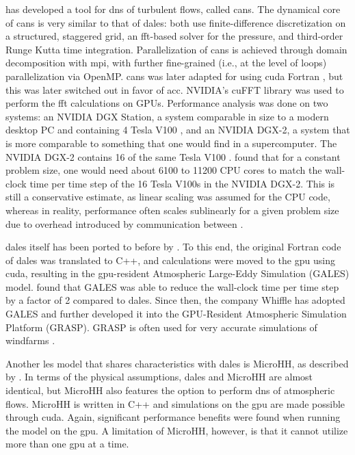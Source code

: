 \citet{costaFFTbasedFinitedifferenceSolver2018} has developed a tool for \acrshort{dns} of turbulent flows, called \acrshort{cans}. The dynamical core of \acrshort{cans} is very similar to that of \acrshort{dales}: both use finite-difference discretization on a structured, staggered grid, an \acrshort{fft}-based solver for the pressure, and third-order Runge Kutta time integration. Parallelization of \acrshort{cans} is achieved through domain decomposition with \acrshort{mpi}, with further fine-grained (i.e., at the level of loops) parallelization via OpenMP. \acrshort{cans} was later adapted for  using \acrshort{cuda} Fortran \citep{costaGPUAccelerationCaNS2021}, but this was later switched out in favor of \acrshort{acc}. NVIDIA's cuFFT library was used to perform the \acrshort{fft} calculations on GPUs. Performance analysis was done on two systems: an NVIDIA DGX Station, a system comparable in size to a modern desktop PC and containing 4 Tesla V100 , and an NVIDIA DGX-2, a system that is more comparable to something that one would find in a supercomputer. The NVIDIA DGX-2 contains 16 of the same Tesla V100 . \citet{costaGPUAccelerationCaNS2021} found that for a constant problem size, one would need about 6100 to 11200 CPU cores to match the wall-clock time per time step of the 16 Tesla V100s in the NVIDIA DGX-2. This is still a conservative estimate, as linear scaling was assumed for the CPU code, whereas in reality, performance often scales sublinearly for a given problem size due to overhead introduced by communication between .

\acrshort{dales} itself has been ported to  before by \citet{schalkwijkHighPerformanceSimulationsTurbulent2012}. To this end, the original Fortran code of \acrshort{dales} was translated to C++, and calculations were moved to the \acrshort{gpu} using \acrshort{cuda}, resulting in the \acrshort{gpu}-resident Atmospheric Large-Eddy Simulation (GALES) model. \citet{schalkwijkHighPerformanceSimulationsTurbulent2012} found that GALES was able to reduce the wall-clock time per time step by a factor of 2 compared to \acrshort{dales}. Since then, the company Whiffle has adopted GALES and further developed it into the GPU-Resident Atmospheric Simulation Platform (GRASP). GRASP is often used for very accurate simulations of windfarms \citep{verzijlberghAtmosphericFlowsLarge2021}.

Another \acrshort{les} model that shares characteristics with \acrshort{dales} is MicroHH, as described by \citet{vanheerwaardenMicroHHComputationalFluid2017}. In terms of the physical assumptions, \acrshort{dales} and MicroHH are almost identical, but MicroHH also features the option to perform \acrshort{dns} of atmospheric flows. MicroHH is written in C++ and simulations on the \acrshort{gpu} are made possible through \acrshort{cuda}. Again, significant performance benefits were found when running the model on the \acrshort{gpu}. A limitation of MicroHH, however, is that it cannot utilize more than one \acrshort{gpu} at a time.


